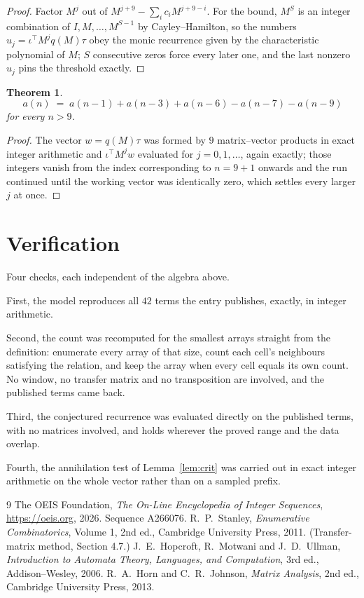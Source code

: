 \documentclass[11pt,a4paper]{article}
\theoremstyle{plain}
\newtheorem{theorem}{Theorem}
\theoremstyle{definition}
\begin{document}
\begin{proof}
Factor $M^{j}$ out of $M^{j+9}-\sum_ic_iM^{j+9-i}$. For the bound, $M^{S}$
is an integer combination of $I,M,\dots,M^{S-1}$ by Cayley--Hamilton, so the numbers
$u_j=\iota^{\!\top}M^{j}q(M)\tau$ obey the monic recurrence given by the characteristic
polynomial of $M$; $S$ consecutive zeros force every later one, and the last nonzero $u_j$
pins the threshold exactly.
\end{proof}

\begin{theorem}
\[
a(n)\;=\;a(n-1) + a(n-3) + a(n-6) - a(n-7) - a(n-9)
\]
for every $n>9$.
\end{theorem}

\begin{proof}
The vector $w=q(M)\tau$ was formed by $9$ matrix--vector products in exact integer
arithmetic and $\iota^{\!\top}M^{j}w$ evaluated for $j=0,1,\dots$, again exactly; those
integers vanish from the index corresponding to $n=9+1$ onwards and the run continued
until the working vector was identically zero, which settles every larger $j$ at once.
\end{proof}

\section{Verification}

Four checks, each independent of the algebra above.

First, the model reproduces all $42$ terms the entry publishes, exactly, in integer
arithmetic.

Second, the count was recomputed for the smallest arrays straight from the definition:
enumerate every array of that size, count each cell's neighbours satisfying the relation, and
keep the array when every cell equals its own count. No window, no transfer matrix and no
transposition are involved, and the published terms came back.

Third, the conjectured recurrence was evaluated directly on the published terms, with no
matrices involved, and holds wherever the proved range and the data overlap.

Fourth, the annihilation test of Lemma~\ref{lem:crit} was carried out in exact integer
arithmetic on the whole vector rather than on a sampled prefix.

\begin{thebibliography}{9}
 The OEIS Foundation, \emph{The On-Line Encyclopedia of Integer
Sequences}, \url{https://oeis.org}, 2026. Sequence A266076.
 R.~P.~Stanley, \emph{Enumerative Combinatorics}, Volume 1, 2nd ed.,
Cambridge University Press, 2011. (Transfer-matrix method, Section 4.7.)
 J.~E.~Hopcroft, R.~Motwani and J.~D.~Ullman, \emph{Introduction to Automata
Theory, Languages, and Computation}, 3rd ed., Addison--Wesley, 2006.
 R.~A.~Horn and C.~R.~Johnson, \emph{Matrix Analysis}, 2nd ed., Cambridge
University Press, 2013.
\end{thebibliography}
\end{document}

